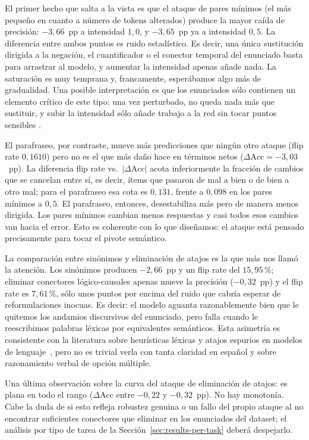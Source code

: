 \documentclass[11pt]{article}
\begin{document}
El primer hecho que salta a la vista es que el ataque de pares mínimos
(el más pequeño en cuanto a número de tokens alterados)
produce la mayor caída de precisión: $-3{,}66$~pp a intensidad $1{,}0$,
y $-3{,}65$~pp ya a intensidad $0{,}5$. La diferencia entre ambos
puntos es ruido estadístico. Es decir, una única sustitución dirigida
a la negación, el cuantificador o el conector temporal del enunciado
basta para arrastrar al modelo, y aumentar la intensidad apenas añade
nada. La saturación es muy temprana y, francamente, esperábamos algo
más de gradualidad. Una posible interpretación es que los enunciados
sólo contienen un elemento crítico de este tipo: una vez perturbado,
no queda nada más que sustituir, y subir la intensidad sólo añade
trabajo a la red sin tocar puntos sensibles \citep{jia-liang-2017-adversarial}.

El parafraseo, por contraste, mueve más predicciones que ningún otro
ataque (flip rate $0{,}1610$) pero no es el que más daño hace en
términos netos ($\Delta\text{Acc} = -3{,}03$~pp). La diferencia
flip rate vs.\ $|\Delta\text{Acc}|$ acota inferiormente la fracción
de cambios que se cancelan entre sí, es decir, ítems que pasaron de
mal a bien o de bien a otro mal; para el parafraseo esa cota es
$0{,}131$, frente a $0{,}098$ en los pares mínimos a $0{,}5$. El
parafraseo, entonces, desestabiliza más pero de manera menos dirigida.
Los pares mínimos cambian menos respuestas y casi todos esos cambios
van hacia el error. Esto es coherente con lo que diseñamos: el ataque
está pensado precisamente para tocar el pivote semántico.

La comparación entre sinónimos y eliminación de atajos es la que más
nos llamó la atención. Los sinónimos producen $-2{,}66$~pp y un flip
rate del $15{,}95\,\%$; eliminar conectores lógico-causales apenas
mueve la precisión ($-0{,}32$~pp) y el flip rate es $7{,}61\,\%$,
sólo unos puntos por encima del ruido que cabría esperar de
reformulaciones inocuas. Es decir: el modelo aguanta razonablemente
bien que le quitemos los andamios discursivos del enunciado, pero
falla cuando le reescribimos palabras léxicas por equivalentes
semánticos. Esta asimetría es consistente con la literatura sobre
heurísticas léxicas y atajos espurios en modelos de
lenguaje~\citep{mccoy-etal-2019-right, gardner-etal-2020-evaluating},
pero no es trivial verla con tanta claridad en español y sobre
razonamiento verbal de opción múltiple.

Una última observación sobre la curva del ataque de eliminación de
atajos: es plana en todo el rango ($\Delta\text{Acc}$ entre $-0{,}22$
y $-0{,}32$~pp). No hay monotonía. Cabe la duda de si esto refleja
robustez genuina o un fallo del propio ataque al no encontrar
suficientes conectores que eliminar en los enunciados del dataset; el
análisis por tipo de tarea de la Sección~\ref{sec:results-per-task}
deberá despejarlo.
\end{document}
